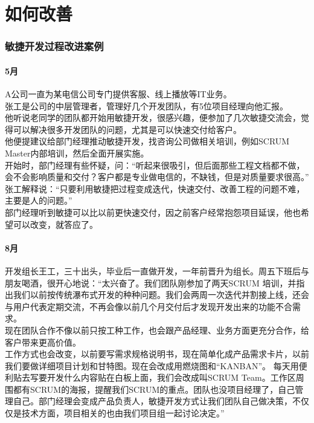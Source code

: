 \chapter{如何改善} %

\hypertarget{ux654fux6377ux5f00ux53d1ux8fc7ux7a0bux6539ux8fdbux6848ux4f8b}{%
\subsection{敏捷开发过程改进案例}\label{ux654fux6377ux5f00ux53d1ux8fc7ux7a0bux6539ux8fdbux6848ux4f8b}}

\hypertarget{ux6708}{%
\subsubsection{5月}\label{ux6708}}

A公司一直为某电信公司专门提供客服、线上播放等IT业务。\\
张工是公司的中层管理者，管理好几个开发团队，有5位项目经理向他汇报。\\
他听说老同学的团队都开始用敏捷开发，很感兴趣，便参加了几次敏捷交流会，觉得可以解决很多开发团队的问题，尤其是可以快速交付给客户。\\
他便提建议给部门经理推动敏捷开发，找咨询公司做相关培训，例如SCRUM
Master内部培训，然后全面开展实施。\\
开始时，部门经理有些怀疑，问：``听起来很吸引，但后面那些工程文档都不做，会不会影响质量和交付？客户都是专业做电信的，不缺钱，但是对质量要求很高。''\\
张工解释说：``只要利用敏捷把过程变成迭代，快速交付、改善工程的问题不难，主要是人的问题。''\\
部门经理听到敏捷可以比以前更快速交付，因之前客户经常抱怨项目延误，他也希望可以改变，就答应了。

\hypertarget{ux6708-1}{%
\subsubsection{8月}\label{ux6708-1}}

开发组长王工，三十出头，毕业后一直做开发，一年前晋升为组长。周五下班后与朋友喝酒，很开心地说：``太兴奋了。我们团队刚参加了两天SCRUM
培训，并指出我们以前按传统瀑布式开发的种种问题。我们会两周一次迭代并割接上线，还会与用户代表定期交流，不再会像以前几个月交付后才发现开发出来的功能不合需求。\\
现在团队合作不像以前只按工种工作，也会跟产品经理、业务方面更充分合作，给客户带来更高价值。\\
工作方式也会改变，以前要写需求规格说明书，现在简单化成产品需求卡片，以前我们要做详细项目计划和甘特图。现在会改成用燃烧图和``KANBAN''。
每天用便利贴去写要开发什么内容贴在白板上面，我们会改成叫SCRUM
Team。工作区周围都有SCRUM的海报，提醒我们SCRUM的重点。团队也没项目经理了，自己管理自己。部门经理会变成产品负责人，敏捷开发方式让我们团队自己做决策，不仅仅是技术方面，项目相关的也由我们项目组一起讨论决定。''\\

